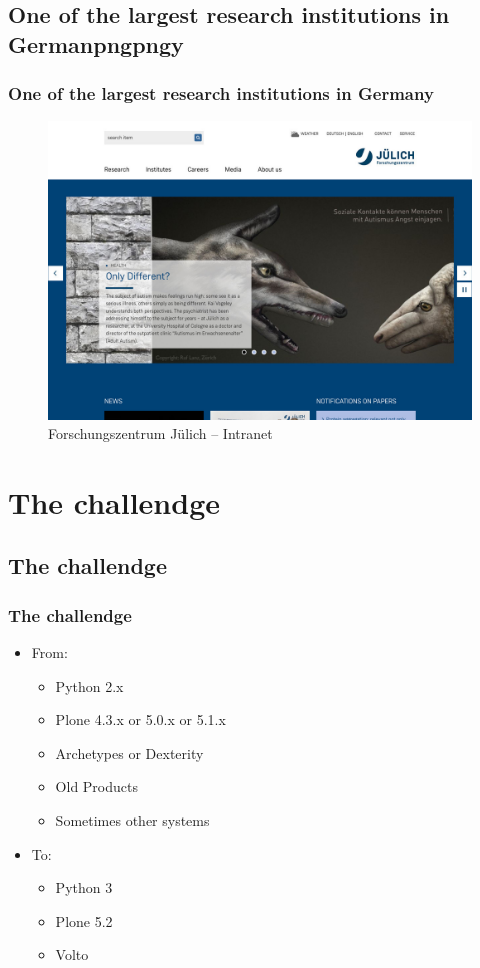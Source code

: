 \documentclass[aspectratio=169]{beamer}
\begin{document}
\subsection{One of the largest research institutions in Germanpngpngy}
\begin{frame}
  \frametitle{One of the largest research institutions in Germany}
  \begin{figure}
    \includegraphics[height=.7\textheight]{./img/005_-_fzj.jpg}
    \caption{Forschungszentrum Jülich -- Intranet}
  \end{figure}
\end{frame}

\section{The challendge}
\subsection{The challendge}
\begin{frame}
  \frametitle{The challendge}
  \begin{itemize}
    \item From:
    \begin{itemize}
      \item Python 2.x \pause
      \item Plone 4.3.x or 5.0.x or 5.1.x \pause
      \item Archetypes or Dexterity \pause
      \item Old Products \pause
      \item Sometimes other systems \pause
    \end{itemize}
    \item To:
    \begin{itemize}
      \item Python 3 \pause
      \item Plone 5.2 \pause
      \item Volto
    \end{itemize}
  \end{itemize}
\end{frame}
\end{document}
